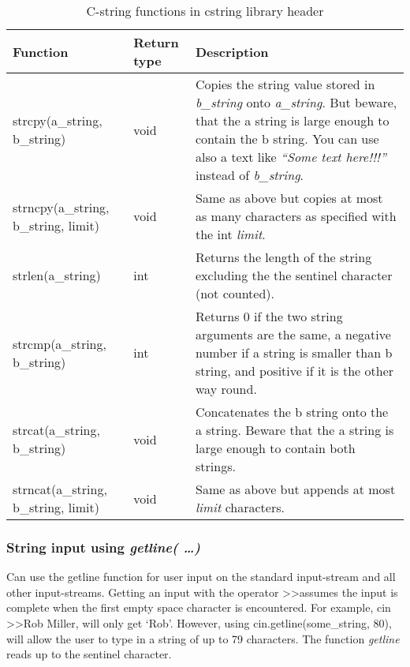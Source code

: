 \begin{table}[h]
\begin{center}
\renewcommand{\arraystretch}{1.8}
\begin{tabular}{ m{7cm} m{1.5cm} m{6cm} } %
\textbf{Function} & \textbf{Return type} & \textbf{Description}\\
\hline

strcpy(a\_string, b\_string) & void & Copies the string value stored in \emph{b\_string} onto \emph{a\_string}.
But beware, that the a string is large enough to contain the b string. You can use also a text like 
\emph{``Some text here!!!''} instead of \emph{b\_string}.\\
\hline

strncpy(a\_string, b\_string, limit) & void & Same as above but copies at most as many characters as
specified with the int \emph{limit}.\\
\hline

strlen(a\_string) & int &Returns the length of the string excluding the the sentinel character (not counted).\\
\hline

strcmp(a\_string, b\_string) & int & Returns 0 if the two string arguments are the same, a negative number
if a string is smaller than b string, and positive if it is the other way round.\\
\hline

strcat(a\_string, b\_string) & void & Concatenates the b string onto the a string. Beware that the
a string is large enough to contain both strings.\\
\hline

strncat(a\_string, b\_string, limit) & void & Same as above but appends at most \emph{limit} characters.\\
\hline

\end{tabular}
\end{center}
\caption{C-string functions in cstring library header}
\label{table_1}
\end{table}

\subsubsection*{String input using \emph{getline( \ldots )}}
Can use the getline function for user input on the standard input-stream and all other input-streams.
Getting an input with the operator \textgreater\textgreater assumes the input is complete when the
first empty space character is encountered. For example, cin \textgreater\textgreater Rob Miller, will
only get `Rob'. However, using cin.getline(some\_string, 80), will allow the user to type in a string
of up to 79 characters. The function \emph{getline} reads up to the sentinel character.

